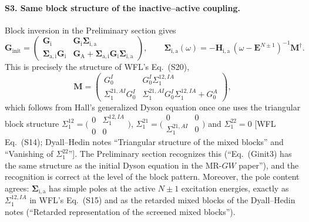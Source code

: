\documentclass[11pt,a4paper]{article}
\newcommand{\bG}{\boldsymbol{G}}
\newcommand{\bSigma}{\boldsymbol{\Sigma}}
\newcommand{\bH}{\boldsymbol{H}}
\newcommand{\bM}{\boldsymbol{M}}
\newcommand{\bE}{\boldsymbol{E}}
\newcommand{\MRGW}{MR-$GW$}
\newcommand{\WFL}{WFL}
\newcommand{\Pre}{Preliminary section}
\newcommand{\DHN}{Dyall--Hedin notes}
\begin{document}
\paragraph{S3. Same block structure of the inactive--active coupling.}
Block inversion in the \Pre{} gives
\begin{equation}
  \bG_{\text{init}}
  =
  \begin{pmatrix}
    \bG_{\mathrm i} & \bG_{\mathrm i}\bSigma_{\mathrm{i,a}} \\
    \bSigma_{\mathrm{a,i}}\bG_{\mathrm i} & \bG_{\mathrm A}+\bSigma_{\mathrm{a,i}}\bG_{\mathrm i}\bSigma_{\mathrm{i,a}}
  \end{pmatrix},
  \qquad
  \bSigma_{\mathrm{i,a}}(\omega)=-\bH_{\mathrm{i,a}}\,(\omega-\bE^{N\pm1})^{-1}\bM^\dagger .
  \label{eq:pre-Ginit2}
\end{equation}
This is precisely the structure of \WFL{}'s Eq.~(S20),
\begin{equation}
  \mathbf M
  =
  \begin{pmatrix}
    G_0^I & G_0^I\Sigma_1^{12,IA} \\
    \Sigma_1^{21,AI}G_0^I & \Sigma_1^{21,AI}G_0^I\Sigma_1^{12,IA}+G_0^A
  \end{pmatrix},
  \label{eq:wfl-S20}
\end{equation}
which follows from Hall's generalized Dyson equation once one uses the
triangular block structure $\Sigma_1^{12}=\bigl(\begin{smallmatrix}0&\Sigma^{12,IA}_1\\0&0\end{smallmatrix}\bigr)$,
$\Sigma_1^{21}=\bigl(\begin{smallmatrix}0&0\\ \Sigma^{21,AI}_1&0\end{smallmatrix}\bigr)$
and $\Sigma_1^{22}=0$ [\WFL{} Eq.~(S14); \DHN{} ``Triangular structure of the
mixed blocks'' and ``Vanishing of $\Sigma_1^{22}$''].  The \Pre{} recognizes
this (``Eq.~(Ginit3) has the same structure as the initial Dyson equation in
the \MRGW{} paper''), and the recognition is correct at the level of the block
pattern.  Moreover, the pole content agrees: $\bSigma_{\mathrm{i,a}}$ has
simple poles at the active $N\pm1$ excitation energies, exactly as
$\Sigma_1^{12,IA}$ in \WFL{}'s Eq.~(S15) and as the retarded mixed blocks of
the \DHN{} (``Retarded representation of the screened mixed blocks'').
\end{document}
